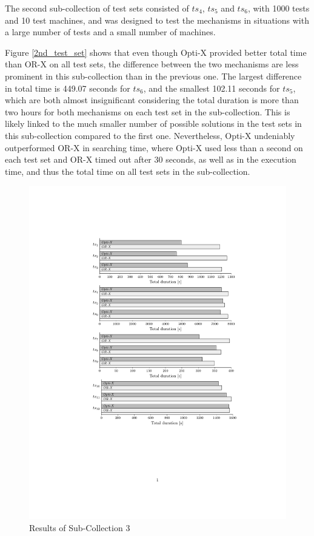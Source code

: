 The second sub-collection of test sets consisted of $ts_4$, $ts_5$ and $ts_6$, with 1000 tests and 10 test machines, and was designed to test the mechanisms in situations with a large number of tests and a small number of machines.

Figure \ref{2nd_test_set} shows that even though Opti-X provided better total time than OR-X on all test sets, the difference between the two mechanisms are less prominent in this sub-collection than in the previous one. The largest difference in total time is 449.07 seconds for $ts_6$, and the smallest 102.11 seconds for $ts_5$, which are both almost insignificant considering the total duration is more than two hours for both mechanisms on each test set in the sub-collection. This is likely linked to the much smaller number of possible solutions in the test sets in this sub-collection compared to the first one. Nevertheless, Opti-X undeniably outperformed OR-X in searching time, where Opti-X used less than a second on each test set and OR-X timed out after 30 seconds, as well as in the execution time, and thus the total time on all test sets in the sub-collection.

\begin{figure}[h!]
    \centering
    \includegraphics[width=\textwidth]{figures/test_results/3rd.pdf}
    \caption{Results of Sub-Collection 3}
    \label{3rd_test_set}
\end{figure}

